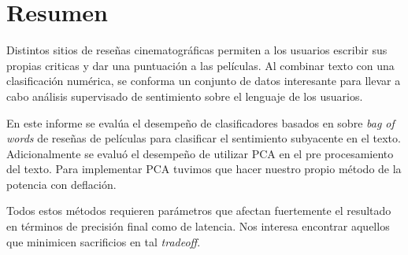\section{Resumen}%
\label{sec:abstracto}

Distintos sitios de reseñas cinematográficas permiten a los usuarios escribir
sus propias criticas y dar una puntuación a las películas.
Al combinar texto con una clasificación numérica, se conforma un conjunto de
datos interesante para llevar a cabo análisis supervisado de sentimiento sobre
el lenguaje de los usuarios.

En este informe se evalúa el desempeño de clasificadores basados en \knn{}
sobre \textit{bag of words} de reseñas de películas para clasificar el
sentimiento subyacente en el texto.
Adicionalmente se evaluó el desempeño de utilizar PCA en el pre
procesamiento del texto.
Para implementar PCA tuvimos que hacer nuestro propio método de la potencia con deflación.

Todos estos métodos requieren parámetros que afectan fuertemente el resultado en
términos de precisión final como de latencia. Nos interesa encontrar aquellos
que minimicen sacrificios en tal \textit{tradeoff}.
